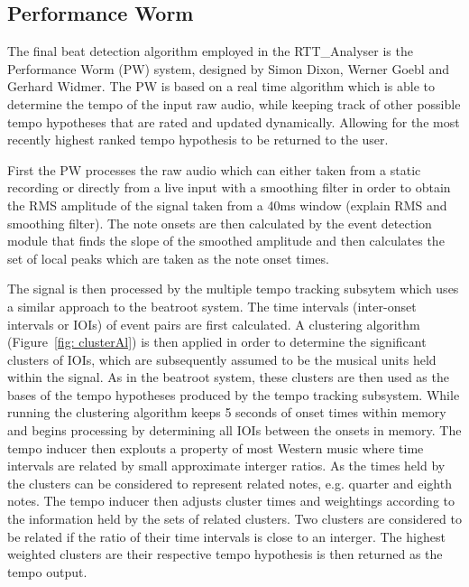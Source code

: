 \documentclass[a4paper, 11pt]{article}
\begin{document}
\subsection{Performance Worm}
The final beat detection algorithm employed in the RTT\_Analyser is the Performance Worm (PW) system, designed by Simon Dixon, Werner Goebl and Gerhard Widmer\cite{dixonGoeblWidmer}. The PW is based on a real time algorithm which is able to determine the tempo of the input raw audio, while keeping track of other possible tempo hypotheses that are rated and updated dynamically. Allowing for the most recently highest ranked tempo hypothesis to be returned to the user\cite{dixonGoeblWidmer}. 

First the PW processes the raw audio which can either taken from a static recording or directly from a live input with a smoothing filter in order to obtain the RMS amplitude of the signal taken from a 40ms window (explain RMS and smoothing filter). The note onsets are then calculated by the event detection module that finds the slope of the smoothed amplitude and then calculates the set of local peaks which are taken as the note onset times\cite{dixonGoeblWidmer}. 

The signal is then processed by the multiple tempo tracking subsytem which uses a similar approach to the beatroot system. The time intervals (inter-onset intervals or IOIs) of event pairs are first calculated. A clustering algorithm (Figure~\ref{fig: clusterAl}) is then applied in order to determine the significant clusters of IOIs, which are subsequently assumed to be the musical units held within the signal. As in the beatroot system, these clusters are then used as the bases of the tempo hypotheses produced by the tempo tracking subsystem. While running the clustering algorithm keeps 5 seconds of onset times within memory and begins processing by determining all IOIs between the onsets in memory. The tempo inducer then explouts a property of most Western music where time intervals are related by small approximate interger ratios. As the times held by the clusters can be considered to represent related notes, e.g. quarter and eighth notes. The tempo inducer then adjusts cluster times and weightings according to the information held by the sets of related clusters. Two clusters are considered to be related if the ratio of their time intervals is close to an interger. The highest weighted clusters are their respective tempo hypothesis is then returned as the tempo output\cite{dixonGoeblWidmer}.
\end{document}
